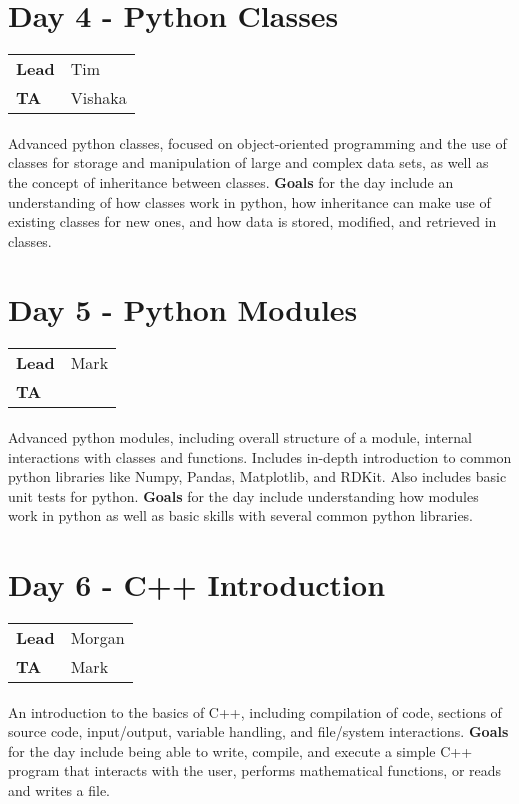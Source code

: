 \documentclass[letterpaper,10pt,oneside]{article}
\begin{document}
\section*{Day 4 - Python Classes}
\begin{tabular}{p{1.5cm}l}
    \textbf{Lead} & Tim \\
    \textbf{TA} & Vishaka \\
\end{tabular}
\paragraph{} Advanced python classes, focused on object-oriented programming and the use of classes for storage and manipulation of large and complex data sets, as well as the concept of inheritance between classes.
\textbf{Goals} for the day include an understanding of how classes work in python, how inheritance can make use of existing classes for new ones, and how data is stored, modified, and retrieved in classes.

\section*{Day 5 - Python Modules}
\begin{tabular}{p{1.5cm}l}
    \textbf{Lead} & Mark \\
    \textbf{TA} & \\
\end{tabular}
\paragraph{} Advanced python modules, including overall structure of a module, internal interactions with classes and functions.  Includes in-depth introduction to common python libraries like Numpy, Pandas, Matplotlib, and RDKit.  Also includes basic unit tests for python.
\textbf{Goals} for the day include understanding how modules work in python as well as basic skills with several common python libraries.

\section*{Day 6 - C++ Introduction}
\begin{tabular}{p{1.5cm}l}
    \textbf{Lead} & Morgan \\
    \textbf{TA} & Mark \\
\end{tabular}
\paragraph{} An introduction to the basics of C++, including compilation of code, sections of source code, input/output, variable handling, and file/system interactions.
\textbf{Goals} for the day include being able to write, compile, and execute a simple C++ program that interacts with the user, performs mathematical functions, or reads and writes a file.
\end{document}
